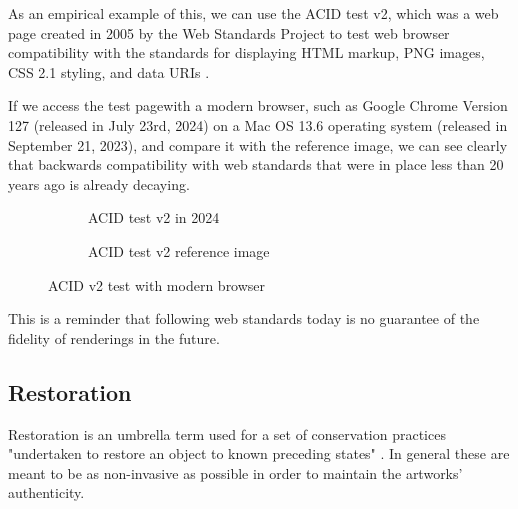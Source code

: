 As an empirical example of this, we can use the ACID test v2, which was a web page created in 2005 by the Web Standards Project to test web browser compatibility with the standards for displaying HTML markup, PNG images, CSS 2.1 styling, and data URIs \cite{Acid22024}.

If we access the test page\footnotemark[5] with a modern browser, such as Google Chrome Version 127 (released in July 23rd, 2024) on a Mac OS 13.6 operating system (released in September 21, 2023), and compare it with the reference image\footnotemark[6], we can see clearly that backwards compatibility with web standards that were in place less than 20 years ago is already decaying.


\begin{figure}[h]
  \centering
  \begingroup
  \setlength{\fboxsep}{0pt} %
  \setlength{\fboxrule}{1pt} %
  \begin{subfigure}[b]{0.45\textwidth}
    \centering
    \caption{ACID test v2 in 2024}
    \label{fig:acid1}
  \end{subfigure}
  \hfill
  \begin{subfigure}[b]{0.45\textwidth}
    \centering
    \caption{ACID test v2 reference image}
    \label{fig:acid2}
  \end{subfigure}
  \endgroup
  \caption{ACID v2 test with modern browser \footnotemark[7]}
  \label{fig:acid2-test}
\end{figure}


This is a reminder that following web standards today is no guarantee of the fidelity of renderings in the future. 

\subsection{Restoration}

Restoration is an umbrella term used for a set of conservation practices "undertaken to restore an object to known preceding states" \cite{dekkerCollectingConservingNet2018}. In general these are meant to be as non-invasive as possible in order to maintain the artworks' authenticity. 

